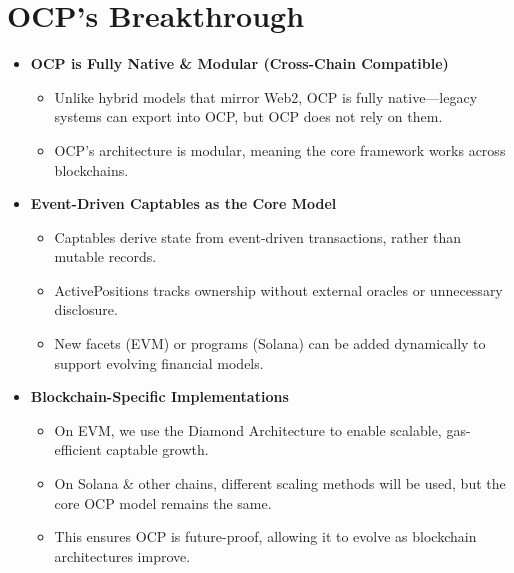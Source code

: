 \documentclass[11pt,a4paper]{article}
\begin{document}
\section{OCP's Breakthrough}
\begin{itemize}
    \item \textbf{OCP is Fully Native \& Modular (Cross-Chain Compatible)}
    \begin{itemize}
        \item Unlike hybrid models that mirror Web2, OCP is fully native---legacy systems can export into OCP, but OCP does not rely on them.
        \item OCP's architecture is modular, meaning the core framework works across blockchains.
    \end{itemize}

    \item \textbf{Event-Driven Captables as the Core Model}
    \begin{itemize}
        \item Captables derive state from event-driven transactions, rather than mutable records.
        \item ActivePositions tracks ownership without external oracles or unnecessary disclosure.
        \item New facets (EVM) or programs (Solana) can be added dynamically to support evolving financial models.
    \end{itemize}

    \item \textbf{Blockchain-Specific Implementations}
    \begin{itemize}
        \item On EVM, we use the Diamond Architecture to enable scalable, gas-efficient captable growth.
        \item On Solana \& other chains, different scaling methods will be used, but the core OCP model remains the same.
        \item This ensures OCP is future-proof, allowing it to evolve as blockchain architectures improve.
    \end{itemize}
\end{itemize}
\end{document}
